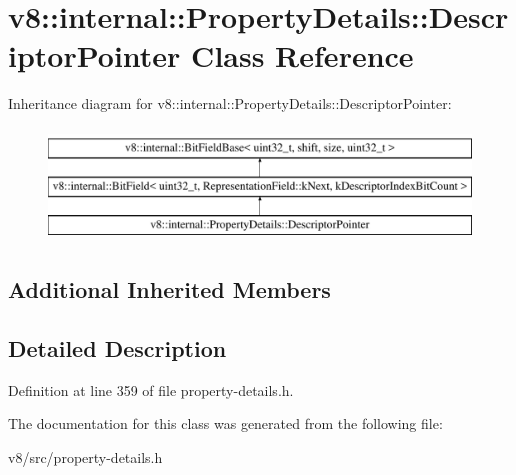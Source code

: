 \hypertarget{classv8_1_1internal_1_1PropertyDetails_1_1DescriptorPointer}{}\section{v8\+:\+:internal\+:\+:Property\+Details\+:\+:Descriptor\+Pointer Class Reference}
\label{classv8_1_1internal_1_1PropertyDetails_1_1DescriptorPointer}
Inheritance diagram for v8\+:\+:internal\+:\+:Property\+Details\+:\+:Descriptor\+Pointer\+:\begin{figure}[H]
\begin{center}
\leavevmode
\includegraphics[height=3.000000cm]{classv8_1_1internal_1_1PropertyDetails_1_1DescriptorPointer}
\end{center}
\end{figure}
\subsection*{Additional Inherited Members}


\subsection{Detailed Description}


Definition at line 359 of file property-\/details.\+h.



The documentation for this class was generated from the following file\+:\begin{DoxyCompactItemize}
\item 
v8/src/property-\/details.\+h\end{DoxyCompactItemize}

